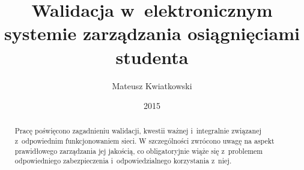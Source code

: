 \documentclass{xmgr}
\author   {Mateusz Kwiatkowski}
\title    {Walidacja w~elektronicznym systemie zarządzania osiągnięciami studenta}
\date     {2015}
\begin{document}
\begin{abstract}

\indent \indent Pracę poświęcono zagadnieniu walidacji, kwestii ważnej i~integralnie związanej z~odpowiednim funkcjonowaniem sieci.
W szczególności zwrócono uwagę na aspekt prawidłowego zarządzania jej jakością, co obligatoryjnie wiąże się z~problemem
odpowiedniego zabezpieczenia i~odpowiedzialnego korzystania z~niej.


\end{abstract}
\end{document}
